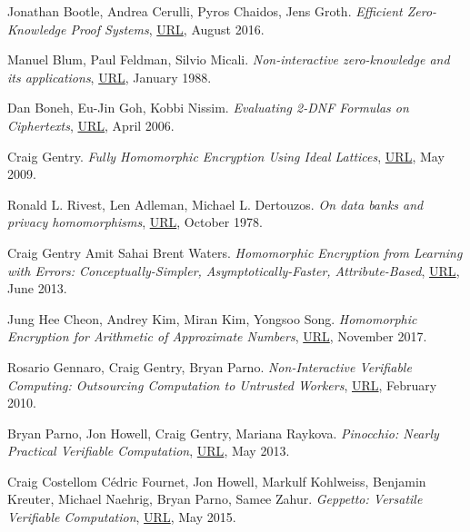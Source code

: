 \documentclass{Resources/UoBLab1}
\theoremstyle{definition}
\begin{document}
\begin{thebibliography}{10}
 Jonathan Bootle, Andrea Cerulli, Pyros Chaidos, Jens Groth. \textit{Efficient Zero-Knowledge Proof Systems}, \href{https://link.springer.com/chapter/10.1007/978-3-319-43005-8_1}{URL}, August 2016.

 Manuel Blum, Paul Feldman, Silvio Micali. \textit{Non-interactive zero-knowledge and its applications}, \href{https://doi.org/10.1145/62212.62222}{URL}, January 1988.

 Dan Boneh, Eu-Jin Goh, Kobbi Nissim. \textit{Evaluating 2-DNF Formulas on Ciphertexts}, \href{https://crypto.stanford.edu/~dabo/papers/2dnf.pdf}{URL}, April 2006.

 Craig Gentry. \textit{Fully Homomorphic Encryption Using Ideal Lattices}, \href{https://www.cs.cmu.edu/~odonnell/hits09/gentry-homomorphic-encryption.pdf}{URL}, May 2009.

 Ronald L. Rivest, Len Adleman, Michael L. Dertouzos. \textit{On data banks and privacy homomorphisms}, \href{https://luca-giuzzi.unibs.it/corsi/Support/papers-cryptography/RAD78.pdf}{URL}, October 1978.

 Craig Gentry Amit Sahai Brent Waters. \textit{Homomorphic Encryption from Learning with Errors: Conceptually-Simpler, Asymptotically-Faster, Attribute-Based}, \href{https://eprint.iacr.org/2013/340.pdf}{URL}, June 2013.

 Jung Hee Cheon, Andrey Kim, Miran Kim, Yongsoo Song. \textit{Homomorphic Encryption for Arithmetic of Approximate Numbers}, \href{https://link.springer.com/chapter/10.1007/978-3-319-70694-8_15}{URL}, November 2017.

 Rosario Gennaro, Craig Gentry, Bryan Parno. \textit{Non-Interactive Verifiable Computing: Outsourcing Computation to Untrusted Workers}, \href{https://eprint.iacr.org/2009/547.pdf}{URL}, February 2010.

 Bryan Parno, Jon Howell, Craig Gentry, Mariana Raykova. \textit{Pinocchio: Nearly Practical Verifiable Computation}, \href{https://eprint.iacr.org/2013/279.pdf}{URL}, May 2013.

 Craig Costellom Cédric Fournet, Jon Howell, Markulf Kohlweiss, Benjamin Kreuter, Michael Naehrig, Bryan Parno, Samee Zahur. \textit{Geppetto: Versatile Verifiable Computation}, \href{https://ieeexplore.ieee.org/stamp/stamp.jsp?tp=&arnumber=7163030}{URL}, May 2015.


\end{thebibliography}
\end{document}
